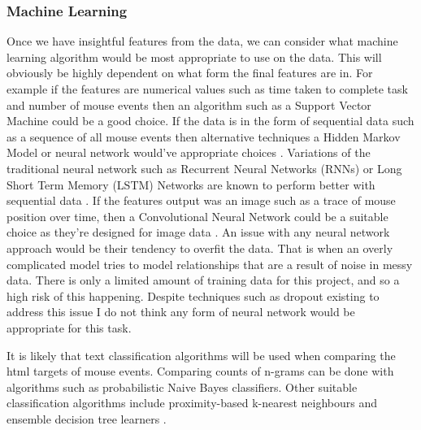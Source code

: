 \documentclass{article}
\begin{document}
\subsubsection{Machine Learning}


Once we have insightful features from the data, we can consider what machine learning algorithm would be most appropriate to use on the data.
This will obviously be highly dependent on what form the final features are in.
For example if the features are numerical values such as time taken to complete task and number of mouse events then an algorithm such as a Support Vector Machine could be a good choice.
If the data is in the form of sequential data such as a sequence of all mouse events then alternative techniques a Hidden Markov Model or neural network would've appropriate choices \cite{xing2010brief}.
Variations of the traditional neural network such as Recurrent Neural Networks (RNNs) or Long Short Term Memory (LSTM) Networks are known to perform better with sequential data \cite{hochreiter1997long}.
If the features output was an image such as a trace of mouse position over time, then a Convolutional Neural Network could be a suitable choice as they're designed for image data \cite{krizhevsky2012imagenet}.
An issue with any neural network approach would be their tendency to overfit the data.
That is when an overly complicated model tries to model relationships that are a result of noise in messy data.
There is only a limited amount of training data for this project, and so a high risk of this happening.
Despite techniques such as dropout \cite{srivastava2014dropout} existing to address this issue I do not think any form of neural network would be appropriate for this task.


It is likely that text classification algorithms will be used when comparing the html targets of mouse events.
Comparing counts of n-grams can be done with algorithms such as probabilistic Naive Bayes classifiers.
Other suitable classification algorithms include proximity-based k-nearest neighbours and ensemble decision tree learners \cite{aggarwal2012survey}.
\end{document}
